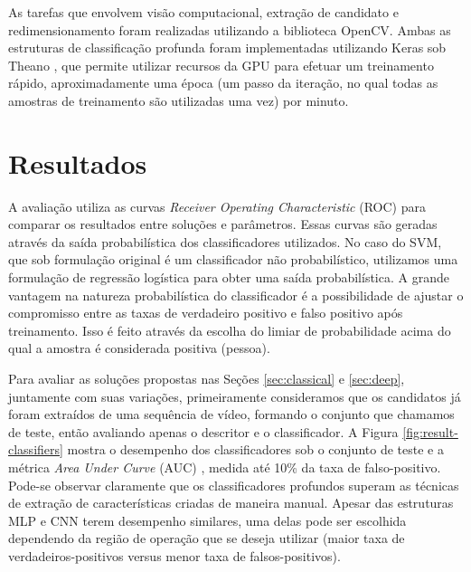         As tarefas que envolvem visão computacional, extração de candidato e redimensionamento foram realizadas utilizando a biblioteca OpenCV. Ambas as estruturas de classificação profunda foram implementadas utilizando Keras \cite{keras} sob Theano \cite{theano}, que permite utilizar recursos da GPU para efetuar um treinamento rápido, aproximadamente uma época (um passo da iteração, no qual todas as amostras de treinamento são utilizadas uma vez) por minuto.

\section{Resultados}
\label{sec:results}

    A avaliação utiliza as curvas \textit{Receiver Operating Characteristic} (ROC) \cite{evaluationMetrics} para comparar os resultados entre soluções e parâmetros. Essas curvas são geradas através da saída probabilística dos classificadores utilizados. No caso do SVM, que sob formulação original é um classificador não probabilístico, utilizamos uma formulação de regressão logística \cite{svmProbabilisticOutput} para obter uma saída probabilística. A grande vantagem na natureza probabilística do classificador é a possibilidade de ajustar o compromisso entre as taxas de verdadeiro positivo e falso positivo após treinamento. Isso é feito através da escolha do limiar de probabilidade acima do qual a amostra é considerada positiva (pessoa).

    Para avaliar as soluções propostas nas Seções \ref{sec:classical} e \ref{sec:deep}, juntamente com suas variações, primeiramente consideramos que os candidatos já foram extraídos de uma sequência de vídeo, formando o conjunto que chamamos de teste, então avaliando apenas o descritor e o classificador. A Figura \ref{fig:result-classifiers} mostra o desempenho dos classificadores sob o conjunto de teste e a métrica \textit{Area Under Curve} (AUC) \cite{evaluationMetrics}, medida até 10\% da taxa de falso-positivo. Pode-se observar claramente que os classificadores profundos superam as técnicas de extração de características criadas de maneira manual. Apesar das estruturas MLP e CNN terem desempenho similares, uma delas pode ser escolhida dependendo da região de operação que se deseja utilizar (maior taxa de verdadeiros-positivos versus menor taxa de falsos-positivos).

    \begin{figure*}[!t]
    \centering
    \label{fig:result-classifiers-all}
    \hfil
    \label{fig:result-classifiers-all-zoom}
    \caption{Desempenho dos classificadores.}
    \label{fig:result-classifiers}
    \end{figure*}

